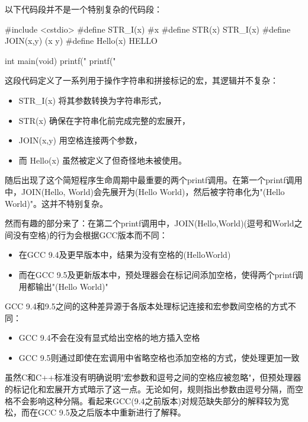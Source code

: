 
以下代码段并不是一个特别复杂的代码段：

\begin{cpp}
#include <cstdio>
#define STR_I(x) #x
#define STR(x) STR_I(x)
#define JOIN(x,y) (x y)
#define Hello(x) HELLO

int main(void){
  printf("%
  printf("%
}
\end{cpp}

这段代码定义了一系列用于操作字符串和拼接标记的宏，其逻辑并不复杂：

\begin{itemize}
\item 
STR\_I(x) 将其参数转换为字符串形式，

\item 
STR(x) 确保在字符串化前完成完整的宏展开，

\item 
JOIN(x,y) 用空格连接两个参数，

\item 
而 Hello(x) 虽然被定义了但奇怪地未被使用。
\end{itemize}

随后出现了这个简短程序生命周期中最重要的两个printf调用。在第一个printf调用中，JOIN(Hello, World)会先展开为(Hello World)，然后被字符串化为"(Hello World)"。这并不特别复杂。

然而有趣的部分来了：在第二个printf调用中，JOIN(Hello,World)(逗号和World之间没有空格)的行为会根据GCC版本而不同：

\begin{itemize}
\item 
在GCC 9.4及更早版本中，结果为没有空格的(HelloWorld)

\item 
而在GCC 9.5及更新版本中，预处理器会在标记间添加空格，使得两个printf调用都输出"(Hello World)"
\end{itemize}

GCC 9.4和9.5之间的这种差异源于各版本处理标记连接和宏参数间空格的方式不同：

\begin{itemize}
\item 
GCC 9.4不会在没有显式给出空格的地方插入空格

\item 
GCC 9.5则通过即使在宏调用中省略空格也添加空格的方式，使处理更加一致
\end{itemize}

虽然C和C++标准没有明确说明"宏参数和逗号之间的空格应被忽略"，但预处理器的标记化和宏展开方式暗示了这一点。无论如何，规则指出参数由逗号分隔，而空格不会影响这种分隔。看起来GCC(9.4之前版本)对规范缺失部分的解释较为宽松，而在GCC 9.5及之后版本中重新进行了解释。

